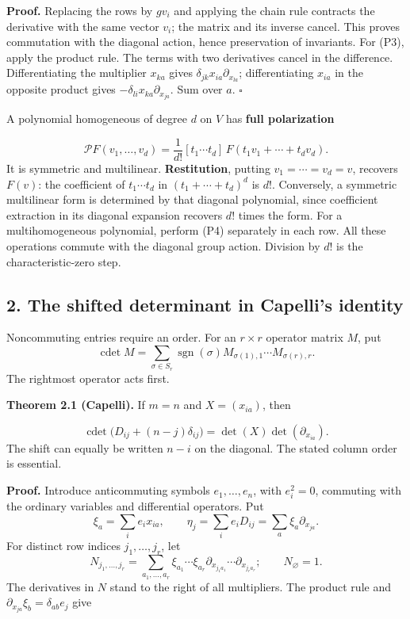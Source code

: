 \documentclass[
]{article}
\begin{document}
\textbf{Proof.} Replacing the rows by \(gv_i\) and applying the chain
rule contracts the derivative with the same vector \(v_i\); the matrix
and its inverse cancel. This proves commutation with the diagonal
action, hence preservation of invariants. For (P3), apply the product
rule. The terms with two derivatives cancel in the difference.
Differentiating the multiplier \(x_{ka}\) gives
\(\delta_{jk}x_{ia}\partial_{x_{la}}\); differentiating \(x_{ia}\) in
the opposite product gives \(-\delta_{li}x_{ka}\partial_{x_{ja}}\). Sum
over \(a\). \(\square\)

A polynomial homogeneous of degree \(d\) on \(V\) has \textbf{full
polarization} \protect{}\label{equation-P4}{}

\[
\mathcal PF(v_1,\ldots,v_d)
=\frac1{d!}[t_1\cdots t_d]\,
F(t_1v_1+\cdots+t_dv_d).
\tag{P4}
\] It is symmetric and multilinear. \textbf{Restitution}, putting
\(v_1=\cdots=v_d=v\), recovers \(F(v)\): the coefficient of
\(t_1\cdots t_d\) in \((t_1+\cdots+t_d)^d\) is \(d!\). Conversely, a
symmetric multilinear form is determined by that diagonal polynomial,
since coefficient extraction in its diagonal expansion recovers \(d!\)
times the form. For a multihomogeneous polynomial, perform (P4)
separately in each row. All these operations commute with the diagonal
group action. Division by \(d!\) is the characteristic-zero step.

\subsection{2. The shifted determinant in Capelli's
identity}\label{section-2}

Noncommuting entries require an order. For an \(r\times r\) operator
matrix \(M\), put \[
\operatorname{cdet}M
=\sum_{\sigma\in S_r}\operatorname{sgn}(\sigma)
M_{\sigma(1),1}\cdots M_{\sigma(r),r}.
\] The rightmost operator acts first.

\protect{}\label{theorem-2-1}{}

\textbf{Theorem 2.1 (Capelli).} If \(m=n\) and \(X=(x_{ia})\), then
\protect{}\label{equation-P5}{}

\[
\operatorname{cdet}\bigl(D_{ij}+(n-j)\delta_{ij}\bigr)
=\det(X)\det(\partial_{x_{ia}}).
\tag{P5}
\] The shift can equally be written \(n-i\) on the diagonal. The stated
column order is essential.

\textbf{Proof.} Introduce anticommuting symbols \(e_1,\ldots,e_n\), with
\(e_i^2=0\), commuting with the ordinary variables and differential
operators. Put \[
\xi_a=\sum_i e_ix_{ia},\qquad
\eta_j=\sum_i e_iD_{ij}=\sum_a\xi_a\partial_{x_{ja}}.
\] For distinct row indices \(j_1,\ldots,j_r\), let \[
N_{j_1,\ldots,j_r}
=\sum_{a_1,\ldots,a_r}
\xi_{a_1}\cdots\xi_{a_r}
\partial_{x_{j_1a_1}}\cdots\partial_{x_{j_ra_r}};
\qquad N_\varnothing=1.
\] The derivatives in \(N\) stand to the right of all multipliers. The
product rule and \(\partial_{x_{ja}}\xi_b=\delta_{ab}e_j\) give
\protect{}\label{equation-P6}{}
\end{document}
